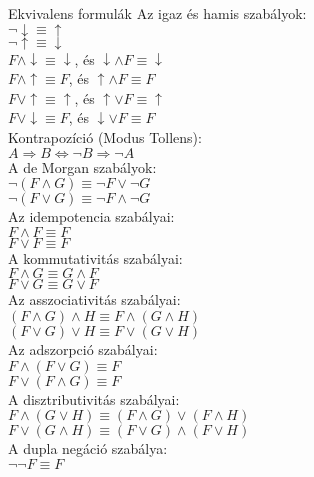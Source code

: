 \documentclass{beamer}
\begin{document}
\begin{frame}

\begin{block}{Ekvivalens formulák}
Az igaz és hamis szabályok:\\
${\neg}\downarrow \equiv \uparrow$\\
${\neg}\uparrow \equiv \downarrow$\\
$F \land \downarrow \equiv \downarrow$, és $\downarrow \land F \equiv \downarrow$\\
$F \land \uparrow \equiv F$, és $\uparrow \land F \equiv F$\\
$F \lor \uparrow \equiv \uparrow$, és $\uparrow \lor F \equiv \uparrow$\\
$F \lor \downarrow \equiv F$, és $\downarrow \lor F \equiv F$\\
\smallskip
Kontrapozíció (Modus Tollens):\\
$A \Rightarrow B \iff {\neg}B \Rightarrow {\neg}A$\\
\smallskip
A de Morgan szabályok:\\
${\neg}(F \land G) \equiv {\neg}F \lor {\neg}G$\\
${\neg}(F \lor G) \equiv {\neg}F \land {\neg}G$\\
\smallskip
Az idempotencia szabályai:\\
$F \land F \equiv F$\\
$F \lor F \equiv F$\\
\smallskip
A kommutativitás szabályai:\\
$F \land G \equiv G \land F$\\
$F \lor G \equiv G \lor F$\\
\smallskip
Az asszociativitás szabályai:\\
$(F \land G) \land H \equiv F \land (G \land H)$\\
$(F \lor G) \lor H \equiv F \lor (G \lor H)$\\
\smallskip
Az adszorpció szabályai:\\
$F \land (F \lor G) \equiv F$\\
$F \lor (F \land G) \equiv F$\\
\smallskip
A disztributivitás szabályai:\\
$F \land (G \lor H) \equiv (F \land G) \lor (F \land H)$\\
$F \lor (G \land H) \equiv (F \lor G) \land (F \lor H)$\\
\smallskip
A dupla negáció szabálya:\\
${\neg}{\neg}F \equiv F$
\end{block}

\end{frame}
\end{document}
